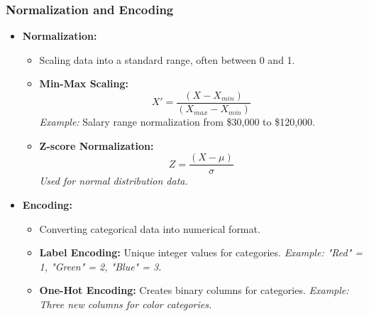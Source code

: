 \documentclass{beamer}
\begin{document}
\begin{frame}[fragile]
    \frametitle{Normalization and Encoding}
    \begin{itemize}
        \item \textbf{Normalization:}
        \begin{itemize}
            \item Scaling data into a standard range, often between 0 and 1.
            \item \textbf{Min-Max Scaling:} 
                \[
                X' = \frac{(X - X_{min})}{(X_{max} - X_{min})}
                \]
                \textit{Example:} Salary range normalization from \$30,000 to \$120,000.
                
            \item \textbf{Z-score Normalization:}
                \[
                Z = \frac{(X - \mu)}{\sigma}
                \]
                \textit{Used for normal distribution data.}
        \end{itemize}

        \item \textbf{Encoding:}
        \begin{itemize}
            \item Converting categorical data into numerical format.
            \item \textbf{Label Encoding:} Unique integer values for categories.
                \textit{Example: "Red" = 1, "Green" = 2, "Blue" = 3.}
                
            \item \textbf{One-Hot Encoding:} Creates binary columns for categories.
                \textit{Example: Three new columns for color categories.}
        \end{itemize}
    \end{itemize}
\end{frame}
\end{document}
